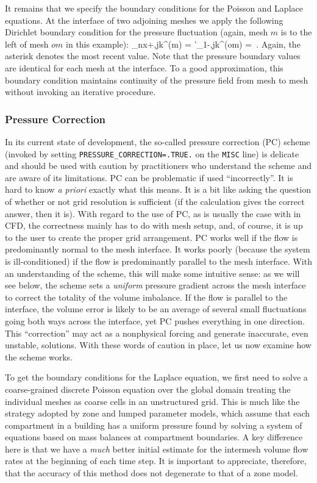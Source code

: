 \documentclass[11pt]{book}
\begin{document}
It remains that we specify the boundary conditions for the Poisson and Laplace equations.  At the interface of two adjoining meshes we apply the following Dirichlet boundary condition for the pressure fluctuation (again, mesh $m$ is to the left of mesh $om$ in this example):
_{nx+\ha,jk}^{(m)} = {\cH'}_{1-\ha,jk}^{(om)} = \left[ {\cH'}_{nx,jk}^{(m),*} + {\cH'}_{1,jk}^{(om),*} \right] \,\mbox{.} \ee
Again, the asterisk denotes the most recent value.  Note that the pressure boundary values are identical for each mesh at the interface.  To a good approximation, this boundary condition maintains continuity of the pressure field from mesh to mesh without invoking an iterative procedure.

\subsubsection{Pressure Correction}

In its current state of development, the so-called pressure correction (PC) scheme (invoked by setting {\tt PRESSURE\_CORRECTION=.TRUE.} on the {\tt MISC} line) is delicate and should be used with caution by practitioners who understand the scheme and are aware of its limitations. PC can be problematic if used ``incorrectly''. It is hard to know \emph{a priori} exactly what this means.  It is a bit like asking the question of whether or not grid resolution is sufficient (if the calculation gives the correct answer, then it is).  With regard to the use of PC, as is usually the case with in CFD, the correctness mainly has to do with mesh setup, and, of course, it is up to the user to create the proper grid arrangement.  PC works well if the flow is predominantly normal to the mesh interface.  It works poorly (because the system is ill-conditioned) if the flow is predominantly parallel to the mesh interface.  With an understanding of the scheme, this will make some intuitive sense: as we will see below, the scheme sets a \emph{uniform} pressure gradient across the mesh interface to correct the totality of the volume imbalance.  If the flow is parallel to the interface, the volume error is likely to be an average of several small fluctuations going both ways across the interface, yet PC pushes everything in one direction.  This ``correction'' may act as a nonphysical forcing and generate inaccurate, even unstable, solutions.  With these words of caution in place, let us now examine how the scheme works.

To get the boundary conditions for the Laplace equation, we first need to solve a coarse-grained discrete Poisson equation over the global domain treating the individual meshes as coarse cells in an unstructured grid. This is much like the strategy adopted by zone and lumped parameter models, which assume that each compartment in a building has a uniform pressure found by solving a system of equations based on mass balances at compartment boundaries.  A key difference here is that we have a \emph{much} better initial estimate for the intermesh volume flow rates at the beginning of each time step. It is important to appreciate, therefore, that the accuracy of this method does not degenerate to that of a zone model.
\end{document}
